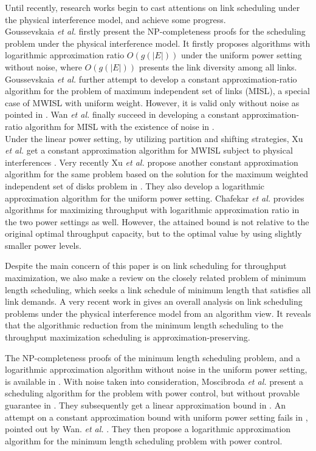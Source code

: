 \documentclass[journal]{IEEEtran}
\begin{document}
\indent Until recently, research works begin to cast attentions on link scheduling under the physical interference model, and achieve some progress.\\
\indent Goussevskaia \emph{et al.} \cite{S:phy1} firstly  present the NP-completeness proofs for the scheduling problem  under the physical interference model. It firstly proposes algorithms with logarithmic  approximation ratio $O(g(|E|))$ under the uniform power setting without noise, where  $O(g(|E|))$  presents the link diversity among all links.  Goussevskaia \emph{et al.} further \cite{S:phy2} attempt to develop a constant approximation-ratio algorithm for the problem  of maximum independent set of links (MISL), a special case of MWISL with uniform weight. However, it is valid only without noise as pointed in \cite{S:phy3}. Wan \emph{et al.} finally succeed in developing a constant approximation-ratio algorithm for MISL with the existence of noise in  \cite{S:phy4}.\\
\indent Under the linear power setting, by utilizing partition and shifting strategies, Xu \emph{et al.}  get a constant approximation algorithm for MWISL subject to physical interferences \cite{S:phy5}. Very recently Xu \emph{et al.} \cite{S:phy9} propose another  constant approximation algorithm for the same problem based on the solution for the maximum weighted independent set of disks problem in \cite{S:ptas}. They also develop a logarithmic approximation algorithm for the uniform power setting. Chafekar \emph{et al.}  \cite{S:phy12} provides  algorithms for maximizing throughput with logarithmic approximation ratio  in the two power settings as well. However, the attained bound is not relative to the original optimal throughput capacity, but to the optimal value by using slightly smaller power levels.

Despite the main concern of this paper is on link scheduling for throughput maximization, we also make a review on the closely related problem of minimum length scheduling, which seeks a link schedule of  minimum length that satisfies all link demands. A very recent work in \cite{S:phy6} gives an overall analysis on link scheduling problems under the physical interference model  from an algorithm view. It reveals that the algorithmic reduction from the minimum length scheduling to the throughput maximization scheduling is approximation-preserving.

The NP-completeness proofs of the  minimum length scheduling problem, and a logarithmic approximation algorithm without noise in the uniform power setting, is  available in \cite{S:phy1}. With noise taken into consideration, Moscibroda \emph{et al.} present a scheduling algorithm for the problem with power control, but without provable guarantee in \cite{S:phy13}. They subsequently get a linear approximation bound in \cite{S:phy14}. An attempt on a constant approximation bound with uniform power setting fails in \cite{S:phy8}, pointed out by Wan. \emph{et al.} \cite{S:phy15}. They \cite{S:phy15} then propose a logarithmic approximation algorithm for the minimum length scheduling problem with power control.
\end{document}
